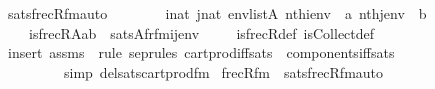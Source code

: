 \begin{isabellebody}
\isanewline
{}\isamarkupfalse%
\ sats{\isacharunderscore}{\kern0pt}frecR{\isacharunderscore}{\kern0pt}fm{\isacharunderscore}{\kern0pt}auto{\isacharcolon}{\kern0pt}\isanewline
\ \ \ \isanewline
\ \ \ \ {\isachardoublequoteopen}i{\isasymin}nat{\isachardoublequoteclose}\ {\isachardoublequoteopen}j{\isasymin}nat{\isachardoublequoteclose}\ {\isachardoublequoteopen}env{\isasymin}list{\isacharparenleft}{\kern0pt}A{\isacharparenright}{\kern0pt}{\isachardoublequoteclose}\ {\isachardoublequoteopen}nth{\isacharparenleft}{\kern0pt}i{\isacharcomma}{\kern0pt}env{\isacharparenright}{\kern0pt}\ {\isacharequal}{\kern0pt}\ a{\isachardoublequoteclose}\ {\isachardoublequoteopen}nth{\isacharparenleft}{\kern0pt}j{\isacharcomma}{\kern0pt}env{\isacharparenright}{\kern0pt}\ {\isacharequal}{\kern0pt}\ b{\isachardoublequoteclose}\isanewline
\ \ \isanewline
\ \ \ \ {\isachardoublequoteopen}is{\isacharunderscore}{\kern0pt}frecR{\isacharparenleft}{\kern0pt}{\isacharhash}{\kern0pt}{\isacharhash}{\kern0pt}A{\isacharcomma}{\kern0pt}a{\isacharcomma}{\kern0pt}b{\isacharparenright}{\kern0pt}\ {\isasymlongleftrightarrow}\ sats{\isacharparenleft}{\kern0pt}A{\isacharcomma}{\kern0pt}{\isacharquery}{\kern0pt}fr{\isacharunderscore}{\kern0pt}fm{\isacharparenleft}{\kern0pt}i{\isacharcomma}{\kern0pt}j{\isacharparenright}{\kern0pt}{\isacharcomma}{\kern0pt}env{\isacharparenright}{\kern0pt}{\isachardoublequoteclose}\isanewline
%
\isadelimproof
\ \ %
\endisadelimproof
%
\isatagproof
{}\isamarkupfalse%
\ \ is{\isacharunderscore}{\kern0pt}frecR{\isacharunderscore}{\kern0pt}def\ is{\isacharunderscore}{\kern0pt}Collect{\isacharunderscore}{\kern0pt}def\ \ \isanewline
\ \ \isamarkupfalse%
\ {\isacharparenleft}{\kern0pt}insert\ assms\ {\isacharsemicolon}{\kern0pt}\ {\isacharparenleft}{\kern0pt}rule\ sep{\isacharunderscore}{\kern0pt}rules{\isacharprime}{\kern0pt}\ cartprod{\isacharunderscore}{\kern0pt}iff{\isacharunderscore}{\kern0pt}sats\ \ components{\isacharunderscore}{\kern0pt}iff{\isacharunderscore}{\kern0pt}sats\isanewline
\ \ \ \ \ \ \ \ {\isacharbar}{\kern0pt}\ simp\ del{\isacharcolon}{\kern0pt}sats{\isacharunderscore}{\kern0pt}cartprod{\isacharunderscore}{\kern0pt}fm{\isacharparenright}{\kern0pt}{\isacharplus}{\kern0pt}{\isacharparenright}{\kern0pt}%
\endisatagproof
{\isafoldproof}%
%
\isadelimproof
\isanewline
%
\endisadelimproof
%
\isadelimML
\isanewline
%
\endisadelimML
%
\isatagML
{}\isamarkupfalse%
\ {\isachardoublequoteopen}frecR{\isacharunderscore}{\kern0pt}fm{\isachardoublequoteclose}\ \ sats{\isacharunderscore}{\kern0pt}frecR{\isacharunderscore}{\kern0pt}fm{\isacharunderscore}{\kern0pt}auto%

\end{isabellebody}
